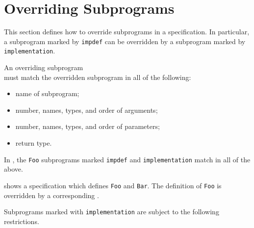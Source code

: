 \FormallyParagraph
\begin{mathpar}
\end{mathpar}

\section{Overriding Subprograms\label{sec:Overriding}}
This section defines how to override subprograms in a specification.
In particular, a subprogram marked by \texttt{impdef} can be overridden by a subprogram marked by \\
\texttt{implementation}.

An overriding \Proseimplementationsubprogram{} subprogram \\
must match the overridden \Proseimpdefsubprogram{} subprogram in all of the following:
\begin{itemize}
  \item name of subprogram;
  \item number, names, types, and order of arguments;
  \item number, names, types, and order of parameters;
  \item return type.
\end{itemize}
In , the \verb|Foo| subprograms marked \texttt{impdef} and \texttt{implementation} match in all of the above.

 shows a specification which defines \Proseimpdefsubprograms{} \verb|Foo| and \verb|Bar|.
The definition of \verb|Foo| is overridden by a corresponding \Proseimplementationsubprogram{}.

\noindent
Subprograms marked with \texttt{implementation} are subject to the following restrictions.

